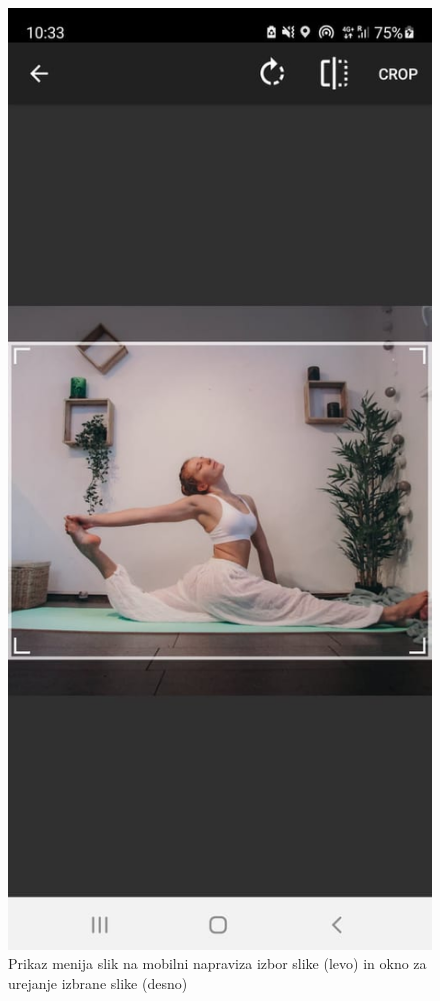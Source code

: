 \documentclass[a4paper, 12pt]{book}
\begin{document}
\begin{figure}[ht]
\begin{minipage}[b]{0.35\textwidth}
  \end{minipage}
  \begin{minipage}[b]{0.35\textwidth}
    \includegraphics[width=\textwidth]{obrezslike.jpg}\centering
  \end{minipage}
    \caption{Prikaz menija slik na mobilni napraviza izbor slike (levo) in okno za urejanje izbrane slike (desno)}
    \label{slike}
\end{figure}
\end{document}

